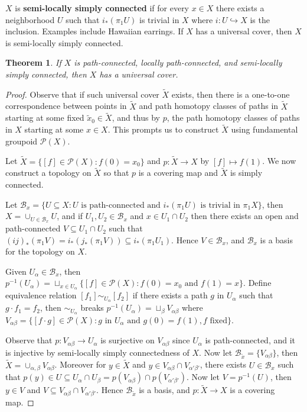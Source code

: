 \documentclass[11pt]{article}
\theoremstyle{definition}
\theoremstyle{plain}
\newtheorem{theorem}{Theorem}[section]
\theoremstyle{remark}
\begin{document}
$X$ is \textbf{semi-locally simply connected} if for every $x\in X$ there exists a neighborhood $U$ such that $i_\ast(\pi_1U)$ is trivial in $X$ where $i:U\hookrightarrow X$ is the inclusion. Examples include Hawaiian earrings. If $X$ has a universal cover, then $X$ is semi-locally simply connected.

\begin{theorem}
If $X$ is path-connected, locally path-connected, and semi-locally simply connected, then $X$ has a universal cover.
\end{theorem}
\begin{proof}
Observe that if such universal cover $\widetilde{X}$ exists, then there is a one-to-one correspondence between points in $\widetilde{X}$ and path homotopy classes of paths in $\widetilde{X}$ starting at some fixed $\widetilde{x}_0\in\widetilde{X}$, and thus by $p$, the path homotopy classes of paths in $X$ starting at some $x\in X$. This prompts us to construct $\widetilde{X}$ using fundamental groupoid $\mathcal{P}(X)$.\medbreak

Let $\widetilde{X}=\{[f]\in\mathcal{P}(X):f(0)=x_0\}$ and $p:\widetilde{X}\to X$ by $[f]\mapsto f(1)$. We now construct a topology on $\widetilde{X}$ so that $p$ is a covering map and $\widetilde{X}$ is simply connected.\medbreak

Let $\mathcal{B}_x=\{U\subseteq X:U\textrm{ is path-connected and }i_\ast(\pi_1U)\textrm{ is trivial in }\pi_1X\}$, then $X=\cup_{U\in\mathcal{B}_x}U$, and if $U_1,U_2\in\mathcal{B}_x$ and $x\in U_1\cap U_2$ then there exists an open and path-connected $V\subseteq U_1\cap U_2$ such that $(ij)_\ast(\pi_1V)=i_\ast(j_\ast(\pi_1V))\subseteq i_\ast(\pi_1U_1)$. Hence $V\in\mathcal{B}_x$, and $\mathcal{B}_x$ is a basis for the topology on $X$.\medbreak

Given $U_\alpha\in\mathcal{B}_x$, then $p^{-1}(U_\alpha)=\sqcup_{x\in U_\alpha}\{[f]\in\mathcal{P}(X):f(0)=x_0\textrm{ and }f(1)=x\}$. Define equivalence relation $[f_1]\sim_{U_\alpha}[f_2]$ if there exists a path $g$ in $U_\alpha$ such that $g\cdot f_1=f_2$, then $\sim_{U_\alpha}$ breaks $p^{-1}(U_\alpha)=\sqcup_\beta V_{\alpha\beta}$ where $V_{\alpha\beta}=\{[f\cdot g]\in\mathcal{P}(X):g\textrm{ in }U_\alpha\textrm{ and }g(0)=f(1),f\textrm{ fixed}\}$.\medbreak

Observe that $p:V_{\alpha\beta}\to U_\alpha$ is surjective on $V_{\alpha\beta}$ since $U_\alpha$ is path-connected, and it is injective by semi-locally simply connectedness of $X$. Now let $\mathcal{B}_{\widetilde{x}}=\{V_{\alpha\beta}\}$, then $\widetilde{X}=\cup_{\alpha,\beta}V_{\alpha\beta}$. Moreover for $y\in\widetilde{X}$ and $y\in V_{\alpha\beta}\cap V_{\alpha'\beta'}$, there exists $U\in\mathcal{B}_x$ such that $p(y)\in U\subseteq U_\alpha\cap U_\beta=p(V_{\alpha\beta})\cap p(V_{\alpha'\beta'})$. Now let $V=p^{-1}(U)$, then $y\in V$ and $V\subseteq V_{\alpha\beta}\cap V_{\alpha'\beta'}$. Hence $\mathcal{B}_{\widetilde{x}}$ is a basis, and $p:\widetilde{X}\to X$ is a covering map.\medbreak


\end{proof}
\end{document}
